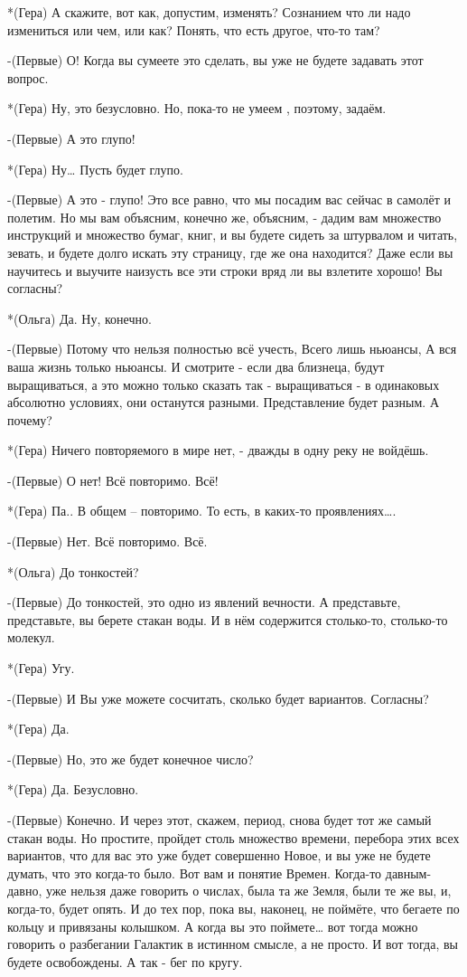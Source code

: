 *(Гера) А скажите, вот как, допустим, изменять? Сознанием что ли надо измениться или чем, или как? Понять, что есть другое, что-то там?

-(Первые) О! Когда вы сумеете это сделать, вы уже не будете задавать этот вопрос.

*(Гера) Ну, это безусловно. Но, пока-то не умеем , поэтому, задаём.

-(Первые) А это глупо! 

*(Гера) Ну… Пусть будет глупо.

-(Первые) А это - глупо! Это все равно, что мы посадим вас сейчас в самолёт и полетим. Но мы вам объясним, конечно же, объясним, -  дадим вам множество инструкций и множество бумаг, книг, и вы будете сидеть за штурвалом и читать, зевать, и будете долго искать эту страницу, где же она находится? Даже если вы научитесь и выучите наизусть все эти строки вряд ли вы взлетите хорошо! Вы согласны?

*(Ольга) Да. Ну, конечно.

-(Первые) Потому что нельзя полностью всё учесть,  Всего лишь ньюансы, А вся ваша жизнь только ньюансы. И смотрите - если два близнеца, будут выращиваться, а это можно только сказать так - выращиваться - в одинаковых абсолютно условиях, они останутся разными. Представление будет разным. А почему?

*(Гера) Ничего повторяемого в мире нет, - дважды в одну реку не войдёшь.

-(Первые) О нет! Всё повторимо. Всё!

*(Гера) Па.. В общем – повторимо. То есть, в каких-то проявлениях….

-(Первые) Нет. Всё повторимо. Всё.

*(Ольга) До тонкостей?

-(Первые) До тонкостей, это одно из явлений вечности. А представьте, представьте, вы берете стакан воды. И в нём содержится столько-то, столько-то молекул.

*(Гера) Угу.

-(Первые) И Вы уже можете сосчитать, сколько будет вариантов. Согласны? 

*(Гера) Да.

-(Первые) Но, это же будет конечное число?

*(Гера) Да. Безусловно.

-(Первые) Конечно. И через этот, скажем, период, снова будет тот же самый стакан воды. Но простите, пройдет столь множество времени, перебора этих всех вариантов, что для вас это уже будет совершенно Новое, и вы уже не будете думать, что это когда-то было. Вот вам и понятие Времен. Когда-то давным-давно, уже нельзя даже говорить о числах, была та же Земля, были те же вы, и, когда-то, будет опять. И до тех пор, пока вы, наконец, не поймёте, что бегаете по кольцу и привязаны колышком. А когда вы это поймете… вот тогда можно говорить о разбегании Галактик в истинном смысле, а не просто. И вот тогда,  вы будете освобождены. А так - бег по кругу.

